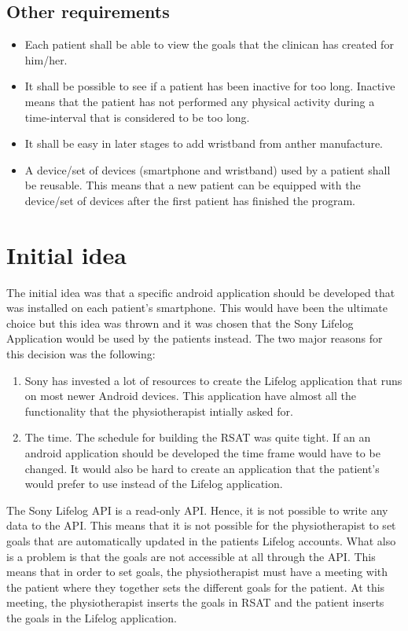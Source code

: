 \documentclass{cslthse-msc}
\begin{document}
\subsection{Other requirements}
\begin{itemize}
    \item Each patient shall be able to view the goals that the clinican has created for him/her.
    \item It shall be possible to see if a patient has been inactive for too long. Inactive means that the patient has not performed any physical activity during a time-interval that is considered to be too long.
    \item It shall be easy in later stages to add wristband from anther manufacture. 
    \item A device/set of devices (smartphone and wristband) used by a patient shall be reusable. This means that a new patient can be equipped with the device/set of devices after the first patient has finished the program. 
\end{itemize}

\section{Initial idea}
The initial idea was that a specific android application should be developed that was installed on each patient's smartphone. This would have been the ultimate choice but this idea was thrown and it was chosen that the Sony Lifelog Application would be used by the patients instead. The two major reasons for this decision was the following: 

\begin{enumerate}
    \item Sony has invested a lot of resources to create the Lifelog application that runs on most newer Android devices. This application have almost all the functionality that the physiotherapist intially asked for.
    \item The time. The schedule for building the RSAT was quite tight. If an an android application should be developed the time frame would have to be changed. It would also be hard to create an application that the patient's would prefer to use instead of the Lifelog application.
\end{enumerate}

The Sony Lifelog API is a read-only API. Hence, it is not possible to write any data to the API. This means that it is not possible for the physiotherapist to set goals that are automatically updated in the patients Lifelog accounts. What also is a problem is that the goals are not accessible at all through the API. This means that in order to set goals, the physiotherapist must have a meeting with the patient where they together sets the different goals for the patient. At this meeting, the physiotherapist inserts the goals in RSAT and the patient inserts the goals in the Lifelog application. 
\end{document}

